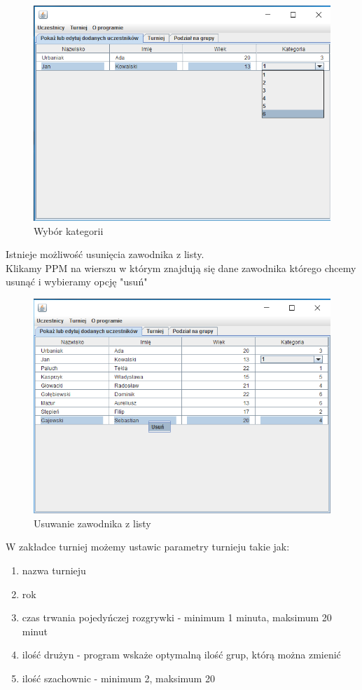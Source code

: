 \begin{figure}[H]
	\centering
	\includegraphics[width=15cm]{fig/5}
	\caption{Wybór kategorii}
	\label {fig:wybor_kategorii} 
\end{figure}
Istnieje możliwość usunięcia zawodnika z listy.\\
Klikamy PPM na wierszu w którym znajdują się dane zawodnika którego chcemy usunąć i wybieramy opcję "usuń" 
\begin{figure}[H]
	\centering
	\includegraphics[width=15cm]{fig/6}
	\caption{Usuwanie zawodnika z listy}
	\label {fig:Usuwanie_zawodnika_z_listy} 
\end{figure}
W zakładce turniej możemy ustawic parametry turnieju takie jak:
\begin{enumerate}
	\item nazwa turnieju
	\item rok
	\item czas trwania pojedyńczej rozgrywki - minimum 1 minuta, maksimum 20 minut
	\item ilość drużyn - program wskaże optymalną ilość grup, którą można zmienić
	\item ilość szachownic - minimum 2, maksimum 20 
\end{enumerate}
